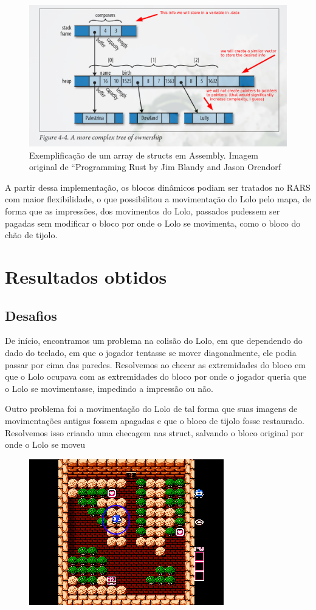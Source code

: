 \documentclass[10pt, conference, compsocconf]{IEEEtran}
\begin{document}
\begin{figure}[htb]
  \begin{center}
   \includegraphics[width=0.3\linewidth]{./Figures/image_8.png}
  \end{center}
  \caption{Exemplificação de um array de structs
em Assembly. Imagem original de “Programming
Rust by Jim Blandy and Jason Orendorf}
  \label{fig:01}
\end{figure}

A partir dessa implementação, os blocos dinâmicos
podiam ser tratados no RARS com maior flexibilidade, o que possibilitou a movimentação do Lolo pelo
mapa, de forma que as impressões, dos movimentos
do Lolo, passados pudessem ser pagadas sem modificar o bloco por onde o Lolo se movimenta, como o
bloco do chão de tijolo.


\section{Resultados obtidos}
\label{sec:Resultados}

\subsection{Desafios}{
\label{sec:MIPS}
De início, encontramos um problema na colisão do
Lolo, em que dependendo do dado do teclado, em que
o jogador tentasse se mover diagonalmente, ele podia
passar por cima das paredes. Resolvemos ao checar
as extremidades do bloco em que o Lolo ocupava com
as extremidades do bloco por onde o jogador queria
que o Lolo se movimentasse, impedindo a impressão
ou não.

Outro problema foi a movimentação do Lolo de
tal forma que suas imagens de movimentações antigas
fossem apagadas e que o bloco de tijolo fosse restaurado. Resolvemos isso criando uma checagem nas
struct, salvando o bloco original por onde o Lolo se
moveu
}

\begin{figure}[htb]
  \begin{center}
   \includegraphics[width=0.3\linewidth]{./Figures/image_9.png}
  \end{center}
  \caption{}
  \label{fig:01}
\end{figure}
\end{document}
